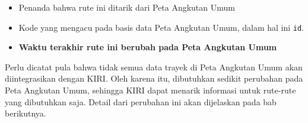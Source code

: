 \begin{itemize}
	\item Penanda bahwa rute ini ditarik dari Peta Angkutan Umum
	\item Kode yang mengacu pada basis data Peta Angkutan Umum, dalam hal ini \texttt{id}.
	\item \textbf{Waktu terakhir rute ini berubah pada Peta Angkutan Umum}
\end{itemize}

Perlu dicatat pula bahwa tidak semua data trayek di Peta Angkutan Umum akan diintegrasikan dengan KIRI. Oleh karena itu, dibutuhkan sedikit perubahan pada Peta Angkutan Umum, sehingga KIRI dapat menarik informasi untuk rute-rute yang dibutuhkan saja. Detail dari perubahan ini akan dijelaskan pada bab berikutnya.